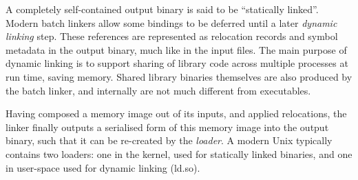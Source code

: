 A completely self-contained output binary is said to be ``statically linked''. 
Modern batch linkers allow some bindings to be deferred until a later \emph{dynamic linking} step.
These references are represented as relocation records and symbol metadata
in the output binary, much like in the input files.
The main purpose of dynamic linking is to support sharing of library code across multiple processes at run time, saving memory.
Shared library binaries themselves are also produced by the batch linker,
and internally are not much different from executables.

Having composed a memory image out of its inputs, and applied relocations, 
the linker finally outputs a serialised form of this memory image
into the output binary, such that it can be re-created by the \emph{loader}.
A modern Unix typically contains two loaders: 
one in the kernel, used for statically linked binaries, and one in user-space used for dynamic linking (\textsf{ld.so}).





